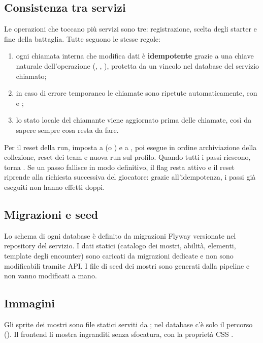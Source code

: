 \documentclass[11pt,a4paper]{article}
\newcommand{\codec}[1]{\texttt{\detokenize{#1}}}
\begin{document}
\subsection{Consistenza tra servizi}

Le operazioni che toccano più servizi sono tre: registrazione, scelta degli starter e fine della battaglia. Tutte seguono le stesse regole:
\begin{enumerate}
  \item ogni chiamata interna che modifica dati è \textbf{idempotente} grazie a una chiave naturale dell'operazione (, , ), protetta da un vincolo  nel database del servizio chiamato;
  \item in caso di errore temporaneo le chiamate sono ripetute automaticamente, con  e ;
  \item lo stato locale del chiamante viene aggiornato prima delle chiamate, così da sapere sempre cosa resta da fare.
\end{enumerate}

Per il reset della run,  imposta  a  (o ) e  a , poi esegue in ordine archiviazione della collezione, reset dei team e nuova run sul profilo. Quando tutti i passi riescono,  torna . Se un passo fallisce in modo definitivo, il flag resta attivo e il reset riprende alla richiesta successiva del giocatore: grazie all'idempotenza, i passi già eseguiti non hanno effetti doppi.

\subsection{Migrazioni e seed}

Lo schema di ogni database è definito da migrazioni Flyway versionate nel repository del servizio. I dati statici (catalogo dei mostri, abilità, elementi, template degli encounter) sono caricati da migrazioni dedicate e non sono modificabili tramite API. I file di seed dei mostri sono generati dalla pipeline  e non vanno modificati a mano.

\subsection{Immagini}

Gli sprite dei mostri sono file statici serviti da ; nel database c'è solo il percorso (). Il frontend li mostra ingranditi senza sfocatura, con la proprietà CSS \codec{image-rendering: pixelated}.
\end{document}
